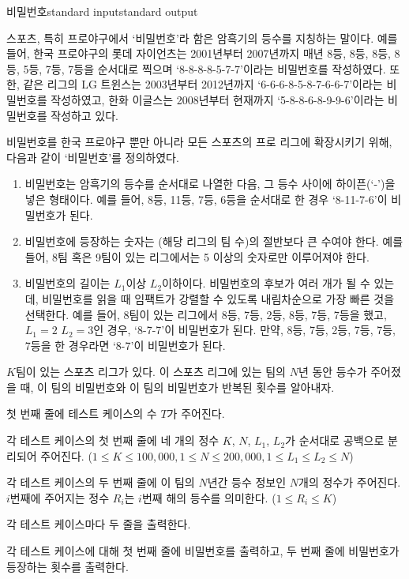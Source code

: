 \begin{problem}{비밀번호}{standard input}{standard output}

스포츠, 특히 프로야구에서 ‘비밀번호’라 함은 암흑기의 등수를 지칭하는 말이다. 예를 들어, 한국 프로야구의 롯데 자이언츠는 2001년부터 2007년까지 매년 8등, 8등, 8등, 8등, 5등, 7등, 7등을 순서대로 찍으며 ‘8-8-8-8-5-7-7’이라는 비밀번호를 작성하였다. 또한, 같은 리그의 LG 트윈스는 2003년부터 2012년까지 ‘6-6-6-8-5-8-7-6-6-7’이라는 비밀번호를 작성하였고, 한화 이글스는 2008년부터 현재까지 ‘5-8-8-6-8-9-9-6’이라는 비밀번호를 작성하고 있다. 

비밀번호를 한국 프로야구 뿐만 아니라 모든 스포츠의 프로 리그에 확장시키기 위해, 다음과 같이 ‘비밀번호’를 정의하였다.

\begin{enumerate}
\item{비밀번호는 암흑기의 등수를 순서대로 나열한 다음, 그 등수 사이에 하이픈(‘-’)을 넣은 형태이다. 
예를 들어, 8등, 11등, 7등, 6등을 순서대로 한 경우 ‘8-11-7-6’이 비밀번호가 된다.}
\item{비밀번호에 등장하는 숫자는 (해당 리그의 팀 수)의 절반보다 큰 수여야 한다. 
예를 들어, 8팀 혹은 9팀이 있는 리그에서는 5 이상의 숫자로만 이루어져야 한다.}
\item{비밀번호의 길이는 $L_1$이상 $L_2$이하이다. 
비밀번호의 후보가 여러 개가 될 수 있는데, 비밀번호를 읽을 때 임팩트가 강렬할 수 있도록 내림차순으로 가장 빠른 것을 선택한다.
예를 들어, 8팀이 있는 리그에서 8등, 7등, 2등, 8등, 7등, 7등을 했고, $L_1=2$ $L_2=3$인 경우, ‘8-7-7’이 비밀번호가 된다. 
만약, 8등, 7등, 2등, 7등, 7등, 7등을 한 경우라면 ‘8-7’이 비밀번호가 된다.}
\end{enumerate}

$K$팀이 있는 스포츠 리그가 있다. 이 스포츠 리그에 있는 팀의 $N$년 동안 등수가 주어졌을 때, 이 팀의 비밀번호와 이 팀의 비밀번호가 반복된 횟수를 알아내자.


\InputFile
첫 번째 줄에 테스트 케이스의 수 $T$가 주어진다.

각 테스트 케이스의 첫 번째 줄에 네 개의 정수 $K$, $N$, $L_1$, $L_2$가 순서대로 공백으로 분리되어 주어진다. 
($1 \le K \le 100,000, 1 \le N \le 200,000, 1 \le L_1 \le L_2 \le N$)

각 테스트 케이스의 두 번째 줄에 이 팀의 $N$년간 등수 정보인 $N$개의 정수가 주어진다. 
$i$번째에 주어지는 정수 $R_i$는 $i$번째 해의 등수를 의미한다. ($1 \le R_i \le K$)

\OutputFile
각 테스트 케이스마다 두 줄을 출력한다.

각 테스트 케이스에 대해 첫 번째 줄에 비밀번호를 출력하고, 두 번째 줄에 비밀번호가 등장하는 횟수를 출력한다.

\Example

\begin{example}
%
\end{example}

\end{problem}
